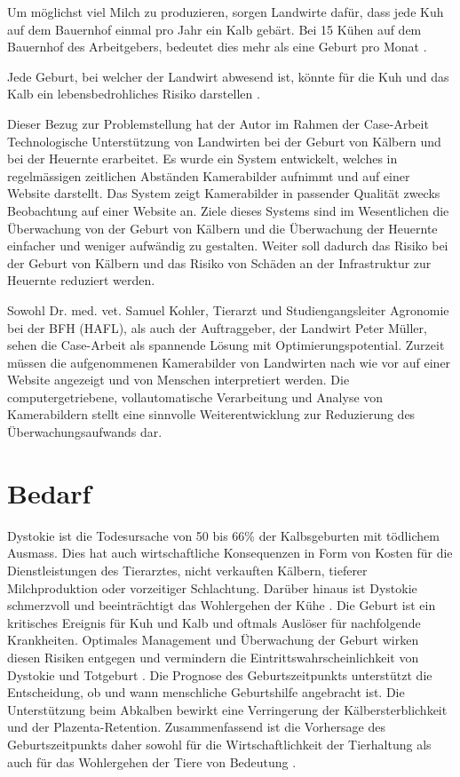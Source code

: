 Um möglichst viel Milch zu produzieren, sorgen Landwirte dafür, dass jede Kuh auf dem Bauernhof einmal pro Jahr ein Kalb gebärt. Bei 15 Kühen auf dem Bauernhof des Arbeitgebers, bedeutet dies mehr als eine Geburt pro Monat \citep{Muller2019}.

Jede Geburt, bei welcher der Landwirt abwesend ist, könnte  für die Kuh und das Kalb ein lebensbedrohliches Risiko darstellen \citep{Muller2019}. 

Dieser Bezug zur Problemstellung hat der Autor im Rahmen der Case-Arbeit \flqq{}Technologische Unterstützung von Landwirten bei der Geburt von Kälbern und bei der Heuernte\frqq{} erarbeitet. Es wurde ein System entwickelt, welches in regelmässigen zeitlichen Abständen Kamerabilder aufnimmt und auf einer Website darstellt. Das System zeigt Kamerabilder in passender Qualität zwecks Beobachtung auf einer Website an. Ziele dieses Systems sind im Wesentlichen die Überwachung von der Geburt von Kälbern und die Überwachung der Heuernte einfacher und weniger aufwändig zu gestalten. Weiter soll dadurch das Risiko bei der Geburt von Kälbern und das Risiko von Schäden an der Infrastruktur zur Heuernte reduziert werden.

Sowohl Dr. med. vet. Samuel Kohler, Tierarzt und Studiengangsleiter Agronomie bei der BFH (HAFL), als auch der Auftraggeber, der Landwirt Peter Müller, sehen die Case-Arbeit als spannende Lösung mit Optimierungspotential. Zurzeit müssen die aufgenommenen Kamerabilder von Landwirten nach wie vor auf einer Website angezeigt und von Menschen interpretiert werden. Die computergetriebene, vollautomatische Verarbeitung und Analyse von Kamerabildern stellt eine sinnvolle Weiterentwicklung zur Reduzierung des Überwachungsaufwands dar. 

\section{Bedarf}

Dystokie ist die Todesursache von 50 bis 66\% der Kalbsgeburten mit tödlichem Ausmass. Dies hat auch wirtschaftliche Konsequenzen in Form von Kosten für die Dienstleistungen des Tierarztes, nicht verkauften Kälbern, tieferer Milchproduktion oder vorzeitiger Schlachtung. Darüber hinaus ist Dystokie schmerzvoll und beeinträchtigt das Wohlergehen der Kühe \citep[S. 349]{Saint-Dizier2015}. Die Geburt ist ein kritisches Ereignis für Kuh und Kalb und oftmals Auslöser für nachfolgende Krankheiten. Optimales Management und Überwachung der Geburt wirken diesen Risiken entgegen und vermindern die Eintrittswahrscheinlichkeit von Dystokie und Totgeburt \citep[S. 4847]{Lange2017}. Die Prognose des Geburtszeitpunkts unterstützt die Entscheidung, ob und wann menschliche Geburtshilfe angebracht ist. Die Unterstützung beim Abkalben bewirkt eine Verringerung der Kälbersterblichkeit und der Plazenta-Retention. Zusammenfassend ist die Vorhersage des Geburtszeitpunkts daher sowohl für die Wirtschaftlichkeit der Tierhaltung als auch für das Wohlergehen der Tiere von Bedeutung \citep[S. 349]{Saint-Dizier2015}.  


